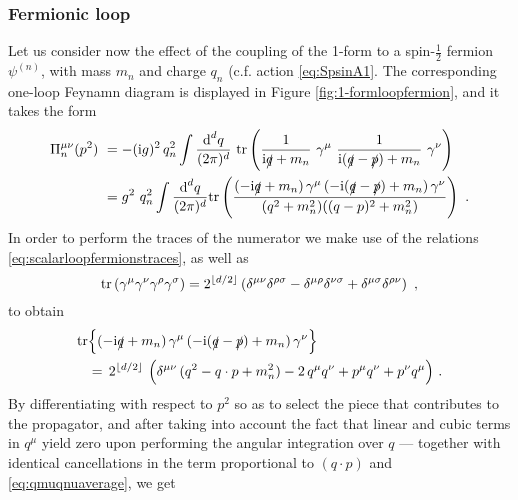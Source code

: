 \subsubsection*{Fermionic loop}
		
Let us consider now the effect of the coupling of the 1-form to a spin-$\frac{1}{2}$ fermion $\psi^{(n)}$, with mass $m_n$ and charge $q_n$ (c.f. action \eqref{eq:SpsinA1}. The corresponding one-loop Feynamn diagram is displayed in Figure \ref{fig:1-formloopfermion}, and it takes the form
%
\begin{equation}\label{eq:A1selfenergyfermion}
			\begin{aligned}
				\Pi^{\mu\nu}_n(p^2) \ &= - (\text{i} g)^2 \, q_n^2  \int \frac {\text{d}^dq}{(2\pi)^d}\ \text{tr} \left (\frac {1}{\text{i} \slashed{q}+m_n}\ \gamma^\mu \ \frac {1}{\text{i} (\slashed{q}-\slashed{p})+m_n} \ \gamma^\nu  \right) \\
				&= g^2\ q_n^2  \int \frac {\text{d}^dq}{(2\pi)^d} \text{tr} \left ( \frac{(-\text{i} \slashed{q} + m_n)\, \gamma^\mu \, (-\text{i}(\slashed{q}-\slashed{p})+m_n)\, \gamma^\nu }{(q^2+m_n^2)((q-p)^2+m_n^2)} \right)\ .  
			\end{aligned}
\end{equation}
%
In order to perform the traces of the numerator we make use of the relations \eqref{eq:scalarloopfermionstraces}, as well as
%
\begin{equation}
			\text{tr} \left(\gamma^{\mu} \gamma^{\nu} \gamma^{\rho} \gamma^{\sigma}\right)= 2^{\lfloor d/2 \rfloor} \left( \delta^{\mu \nu}\delta^{\rho \sigma}-\delta^{\mu \rho}\delta^{\nu \sigma}+\delta^{\mu \sigma}\delta^{\rho \nu} \right)\ ,
\label{eq:traceidentityfour}
\end{equation}
%
to obtain
%
\begin{equation}
\label{eq:traces1-formloop}
			\begin{split}
				\text{tr}& \Big \lbrace (-\text{i} \slashed{q} + m_n)\, \gamma^\mu \, (-\text{i}(\slashed{q}-\slashed{p})+m_n)\, \gamma^\nu \Big \rbrace \\
				& =\, 2^{\lfloor d/2 \rfloor} \, \left( \delta^{\mu \nu} \, (q^2 - q\cdot p + m_n^2)- 2\,  q^\mu q^\nu+p^\mu q^\nu+p^\nu q^\mu  \right) \, . 
			\end{split}
\end{equation}
%
By differentiating with respect to $p^2$ so as to select the piece that contributes to the propagator, and after taking into account the fact that  linear and cubic  terms in $q^\mu$ yield zero upon performing the angular integration over $q$ --- together with identical cancellations in the term proportional to $(q\cdot p)$ and \eqref{eq:qmuqnuaverage}, we get
